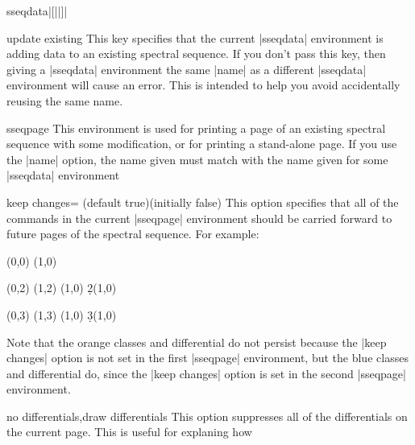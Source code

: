 \documentclass{ltxdoc}
\begin{document}
\begin{sseqdata}[name=ex1,degree={#1}{1-#1}]
\begin{environment}{{sseqdata}|[||]|}
\begin{key}{update existing}
This key specifies that the current |sseqdata| environment is adding data to an existing spectral sequence. If you don't pass this key, then giving a |sseqdata| environment the same |name| as a different |sseqdata| environment will cause an error. This is intended to help you avoid accidentally reusing the same name.
\end{key}
\end{environment}

\begin{environment}{{sseqpage}}
This environment is used for printing a page of an existing spectral sequence with some modification, or for printing a stand-alone page. If you use the |name| option, the name given must match with the name given for some |sseqdata| environment

\begin{key}{keep changes= (default true)(initially false)}
This option specifies that all of the commands in the current |sseqpage| environment should be carried forward to future pages of the spectral sequence. For example:
\begin{codeexample}[]
\begin{sseqdata}[name=keep changes example,Adams grading,y range={0}{3}]
\class(0,0)
\class(1,0)
\end{sseqdata}

\begin{sseqpage}[name=keep changes example,paths=orange]
\class(0,2)
\class(1,2)
\classoptions[orange](1,0)
\d2(1,0)
\end{sseqpage}
%
\hskip1cm
%
\begin{sseqpage}[name=keep changes example,paths=blue,keep changes]
\class(0,3)
\class(1,3)
\classoptions[blue](1,0)
\d3(1,0)
\end{sseqpage}
%
\hskip1cm
%
\printpage[name=keep changes example,page=3]
\end{codeexample}
Note that the orange classes and differential do not persist because the |keep changes| option is not set in the first |sseqpage| environment, but the blue classes and differential do, since the |keep changes| option is set in the second |sseqpage| environment.
\end{key}

\begin{keylist}{no differentials,draw differentials}
This option suppresses all of the differentials on the current page. This is useful for explaning how
\end{keylist}


\end{environment}
\end{sseqdata}
\end{document}
